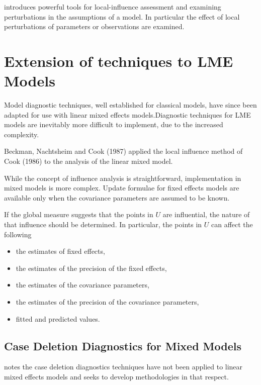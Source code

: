 \documentclass[Main.tex]{subfiles}
\begin{document}
\citet{cook86} introduces powerful tools for local-influence assessment and examining perturbations in the assumptions of a model. In particular the effect of local perturbations of parameters or observations are examined.


\newpage
\section{Extension of techniques to LME Models} %

Model diagnostic techniques, well established for classical models, have since been adapted for use with linear mixed effects models.Diagnostic techniques for LME models are inevitably more difficult to implement, due to the increased complexity.

Beckman, Nachtsheim and Cook (1987) \citet{Beckman} applied the local influence method of Cook (1986) to the analysis of the linear mixed model.

While the concept of influence analysis is straightforward, implementation in mixed models is more complex. Update formulae for fixed effects models are available only when the covariance parameters are assumed to be known.

If the global measure suggests that the points in $U$ are influential, the nature of that influence should be determined. In particular, the points in $U$ can affect the following

\begin{itemize}
	\item the estimates of fixed effects,
	\item the estimates of the precision of the fixed effects,
	\item the estimates of the covariance parameters,
	\item the estimates of the precision of the covariance parameters,
	\item fitted and predicted values.
\end{itemize}


\newpage


\subsection{Case Deletion Diagnostics for Mixed Models}

\citet{Christiansen} notes the case deletion diagnostics techniques have not been applied to linear mixed effects models and seeks to develop methodologies in that respect.
\end{document}
